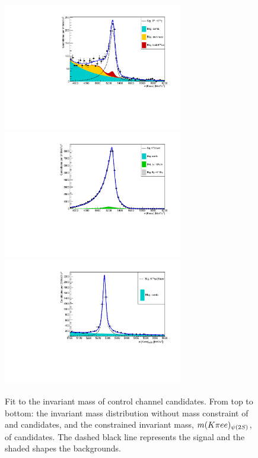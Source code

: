 \begin{figure}[h!]
\centering
\includegraphics[width=0.7\textwidth]{RKst/figs/Fit/fit_EE/fit_G.pdf}
\includegraphics[width=0.7\textwidth]{RKst/figs/Fit/fit_EE/fit_JPs_P.pdf}
\includegraphics[width=0.7\textwidth]{RKst/figs/Fit/fit_EE/fit_Psi.pdf}
\caption{Fit to the \mKpiee invariant mass of control channel candidates.
From top to bottom: the invariant mass distribution without mass constraint of \BdToKstGee
and \BdToKstJPsee candidates, and the constrained invariant mass, $\mKpiee_{\psitwos}$, of \BdToKstPsiee candidates.
The dashed black line represents the signal and the shaded shapes the backgrounds.}
\label{fig:fitsControlEE}
\end{figure}

\clearpage

